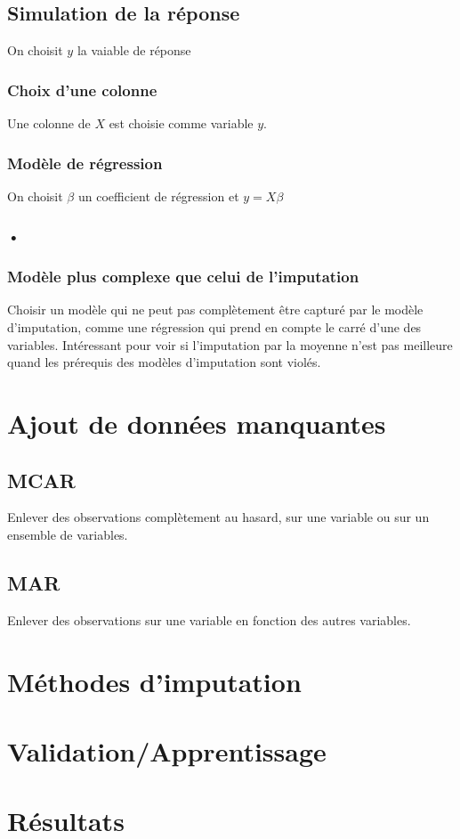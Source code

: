 \documentclass[12pt, a4paper]{article}
\begin{document}
\subsection{Simulation de la réponse}
On choisit $y$ la vaiable de réponse

\subsubsection{Choix d'une colonne}
Une colonne de $X$ est choisie comme variable $y$.

\subsubsection{Modèle de régression}
On choisit $\beta$ un coefficient de régression et $y = X\beta$

\subsubsection{•}

\subsubsection{Modèle plus complexe que celui de l'imputation}
Choisir un modèle qui ne peut pas complètement être capturé par le modèle d'imputation, comme une régression qui prend en compte le carré d'une des variables. Intéressant pour voir si l'imputation par la moyenne n'est pas meilleure quand les prérequis des modèles d'imputation sont violés.

\section{Ajout de données manquantes}
\label{missdata}
\subsection{MCAR}
Enlever des observations complètement au hasard, sur une variable ou sur un ensemble de variables.

\subsection{MAR}
Enlever des observations sur une variable en fonction des autres variables.

\section{Méthodes d'imputation}
\label{imputation}

\section{Validation/Apprentissage}
\label{split}

\section{Résultats}
\label{Results}
\end{document}
